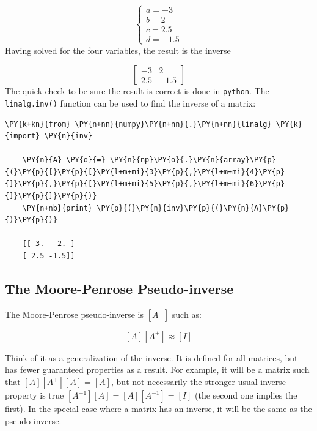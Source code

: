 \[
\begin{cases}
a=−3\\
b=2\\
c=2.5\\
d=−1.5
\end{cases}
\]
Having solved for the four variables, the result is the inverse

\[
\begin{bmatrix}
−3 & 2\\
2.5 & −1.5
\end{bmatrix}
\]
The quick check to be sure the result is correct is done in \texttt{python}.
The \texttt{linalg.inv()} function can be used to find the inverse of a
matrix:

\begin{tcolorbox}[breakable, size=fbox, boxrule=1pt, pad at break*=1mm,colback=cellbackground, colframe=cellborder]
	\begin{Verbatim}[commandchars=\\\{\}]
	\PY{k+kn}{from} \PY{n+nn}{numpy}\PY{n+nn}{.}\PY{n+nn}{linalg} \PY{k}{import} \PY{n}{inv}
	
	\PY{n}{A} \PY{o}{=} \PY{n}{np}\PY{o}{.}\PY{n}{array}\PY{p}{(}\PY{p}{[}\PY{p}{[}\PY{l+m+mi}{3}\PY{p}{,}\PY{l+m+mi}{4}\PY{p}{]}\PY{p}{,}\PY{p}{[}\PY{l+m+mi}{5}\PY{p}{,}\PY{l+m+mi}{6}\PY{p}{]}\PY{p}{]}\PY{p}{)}
	\PY{n+nb}{print} \PY{p}{(}\PY{n}{inv}\PY{p}{(}\PY{n}{A}\PY{p}{)}\PY{p}{)}
	
	[[-3.   2. ]
	[ 2.5 -1.5]]
	\end{Verbatim}
\end{tcolorbox}

\subsection{The Moore-Penrose Pseudo-inverse}
\label{the-moore-penrose-pseudoinverse}

The Moore-Penrose pseudo-inverse is \([A^+]\) such as:

\[[A][A^+]≈[I]\]

Think of it as a generalization of the inverse. It is defined for all
matrices, but has fewer guaranteed properties as a result. For example,
it will be a matrix such that \([𝐴][𝐴^+][𝐴]=[𝐴]\), but not necessarily
the stronger usual inverse property is true \([𝐴^{−1}][𝐴]=[𝐴][𝐴^{−1}]=[𝐼]\) (the second one implies the first). In the special case where a matrix has an inverse, it will be the same as the pseudo-inverse.

